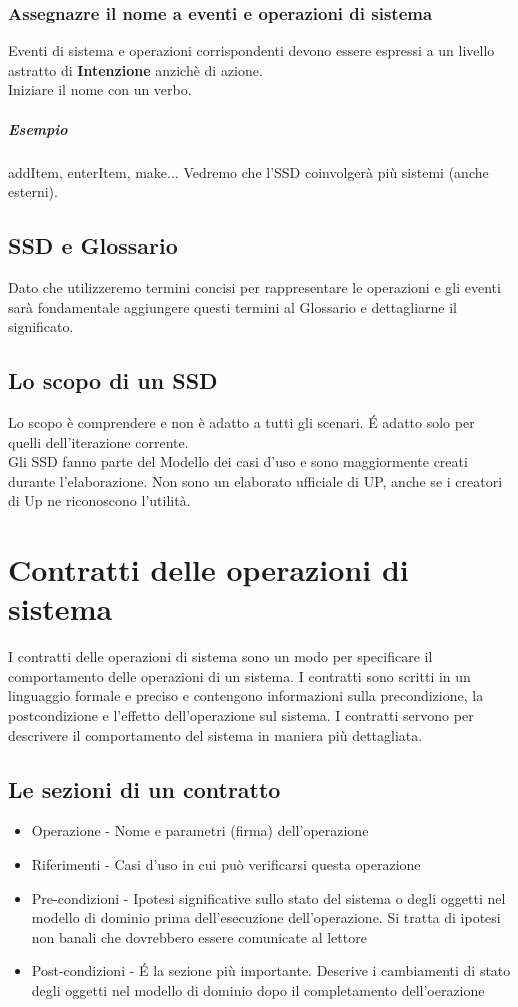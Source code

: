 \subsection*{Assegnazre il nome a eventi e operazioni di sistema}
Eventi di sistema e operazioni corrispondenti devono essere espressi a un livello 
astratto di \textbf{Intenzione} anzichè di azione.
\\ Iniziare il nome con un verbo.
\paragraph*{Esempio} addItem, enterItem, make... 
Vedremo che l'SSD coinvolgerà più sistemi (anche esterni).
\section{SSD e Glossario}
Dato che utilizzeremo termini concisi per rappresentare le operazioni e gli eventi sarà fondamentale
aggiungere questi termini al Glossario e dettagliarne il significato.
\section{Lo scopo di un SSD}
Lo scopo è comprendere e non è adatto a tutti gli scenari. \'E adatto solo per quelli dell'iterazione
corrente.
\\ Gli SSD fanno parte del Modello dei casi d'uso e sono maggiormente creati durante l'elaborazione.
Non sono un elaborato ufficiale di UP, anche se i creatori di Up ne riconoscono l'utilità.

\chapter{Contratti delle operazioni di sistema}
I contratti delle operazioni di sistema sono un modo per specificare il comportamento delle operazioni
di un sistema. I contratti sono scritti in un linguaggio formale e preciso e contengono
informazioni sulla precondizione, la postcondizione e l'effetto dell'operazione sul sistema.
I contratti servono per descrivere il comportamento del sistema in maniera più dettagliata.
\section{Le sezioni di un contratto}
\begin{itemize}
    \item Operazione - Nome e parametri (firma) dell'operazione
    \item Riferimenti - Casi d'uso in cui può verificarsi questa operazione
    \item Pre-condizioni - Ipotesi significative sullo stato del sistema o degli oggetti nel modello
    di dominio prima dell'esecuzione dell'operazione. Si tratta di ipotesi non banali che dovrebbero
    essere comunicate al lettore
    \item Post-condizioni - \'E la sezione più importante. Descrive i cambiamenti di stato degli oggetti
    nel modello di dominio dopo il completamento dell'oerazione
\end{itemize}
